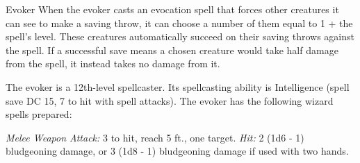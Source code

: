 \documentclass[10pt,a4paper,twoside,bg=print,twocolumn,openany,nodeprecatedcode]{dndbook}
\begin{document}
\begin{DndMonster}[float=t]{Evoker}
\DndMonsterBasics[
armor-class = {12 (15 with \textit{mage armor})},
hit-points = {\DndDice{12d8 + 12}},
speed = {30 ft.}
]
\DndMonsterAbilityScores[
 str = 9,
 dex = 14,
 con = 12,
 int = 17,
 wis = 12,
 cha = 11
]
\DndMonsterDetails[
saving-throws = {Int +7, Wis +5},
skills = {Arcana +7, History +7},
languages = {any four languages},
challenge = 9,
]
When the evoker casts an evocation spell that forces other creatures it can see to make a saving throw, it can choose a number of them equal to 1 + the spell's level. These creatures automatically succeed on their saving throws against the spell. If a successful save means a chosen creature would take half damage from the spell, it instead takes no damage from it.

The evoker is a 12th-level spellcaster. Its spellcasting ability is Intelligence (spell save DC 15, 7 to hit with spell attacks). The evoker has the following wizard spells prepared:
\begin{DndMonsterSpells}
\end{DndMonsterSpells}
\textsl{Melee Weapon Attack:} 3 to hit, reach 5 ft., one target. \textsl{Hit:} 2 (1d6 - 1) bludgeoning damage, or 3 (1d8 - 1) bludgeoning damage if used with two hands.

\end{DndMonster}
\end{document}
